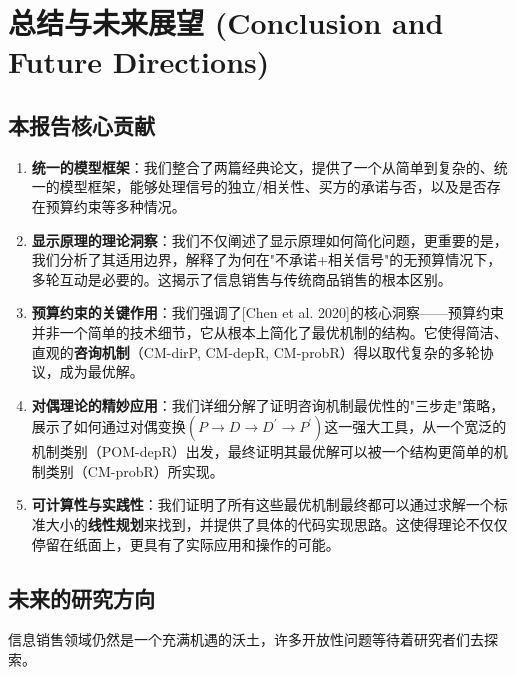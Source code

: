 \section{总结与未来展望 (Conclusion and Future Directions)}

\subsection{本报告核心贡献}

\begin{enumerate}
    \item \textbf{统一的模型框架}：我们整合了两篇经典论文，提供了一个从简单到复杂的、统一的模型框架，能够处理信号的独立/相关性、买方的承诺与否，以及是否存在预算约束等多种情况。
    \item \textbf{显示原理的理论洞察}：我们不仅阐述了显示原理如何简化问题，更重要的是，我们分析了其适用边界，解释了为何在"不承诺+相关信号"的无预算情况下，多轮互动是必要的。这揭示了信息销售与传统商品销售的根本区别。
    \item \textbf{预算约束的关键作用}：我们强调了[Chen et al. 2020]的核心洞察——预算约束并非一个简单的技术细节，它从根本上简化了最优机制的结构。它使得简洁、直观的\textbf{咨询机制}（CM-dirP, CM-depR, CM-probR）得以取代复杂的多轮协议，成为最优解。
    \item \textbf{对偶理论的精妙应用}：我们详细分解了证明咨询机制最优性的"三步走"策略，展示了如何通过对偶变换$(P\to D\to D^\prime \to P^\prime)$这一强大工具，从一个宽泛的机制类别（POM-depR）出发，最终证明其最优解可以被一个结构更简单的机制类别（CM-probR）所实现。
    \item \textbf{可计算性与实践性}：我们证明了所有这些最优机制最终都可以通过求解一个标准大小的\textbf{线性规划}来找到，并提供了具体的代码实现思路。这使得理论不仅仅停留在纸面上，更具有了实际应用和操作的可能。
\end{enumerate}

\subsection{未来的研究方向}

信息销售领域仍然是一个充满机遇的沃土，许多开放性问题等待着研究者们去探索。

